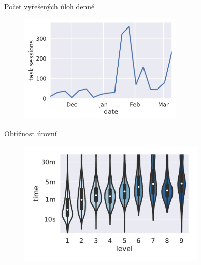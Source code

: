 \documentclass[
]{beamer}
\begin{document}
\begin{frame}{Počet vyřešených úloh denně}
\begin{figure}
\includegraphics[width=0.7\textwidth]{../img/daily-task-sessions}
\end{figure}
\end{frame}

\begin{frame}{Obtížnost úrovní}
\begin{figure}
\includegraphics[width=0.8\textwidth]{../img/levels-time}
\end{figure}
\end{frame}
\end{document}
